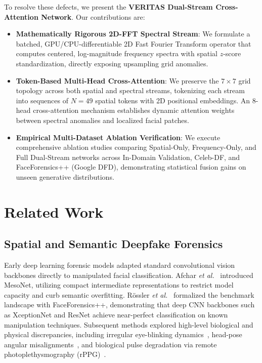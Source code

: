 \documentclass[journal,10pt,twocolumn]{article}
\begin{document}
To resolve these defects, we present the \textbf{VERITAS Dual-Stream Cross-Attention Network}. Our contributions are:
\begin{itemize}
    \item \textbf{Mathematically Rigorous 2D-FFT Spectral Stream}: We formulate a batched, GPU/CPU-differentiable 2D Fast Fourier Transform operator that computes centered, log-magnitude frequency spectra with spatial $z$-score standardization, directly exposing upsampling grid anomalies.
    \item \textbf{Token-Based Multi-Head Cross-Attention}: We preserve the $7 \times 7$ grid topology across both spatial and spectral streams, tokenizing each stream into sequences of $N=49$ spatial tokens with 2D positional embeddings. An 8-head cross-attention mechanism establishes dynamic attention weights between spectral anomalies and localized facial patches.
    \item \textbf{Empirical Multi-Dataset Ablation Verification}: We execute comprehensive ablation studies comparing Spatial-Only, Frequency-Only, and Full Dual-Stream networks across In-Domain Validation, Celeb-DF, and FaceForensics++ (Google DFD), demonstrating statistical fusion gains on unseen generative distributions.
\end{itemize}

\section{Related Work}
\label{sec:related}

\subsection{Spatial and Semantic Deepfake Forensics}
Early deep learning forensic models adapted standard convolutional vision backbones directly to manipulated facial classification. Afchar \textit{et al.}~\cite{afchar2018mesonet} introduced MesoNet, utilizing compact intermediate representations to restrict model capacity and curb semantic overfitting. R{\"o}ssler \textit{et al.}~\cite{rossler2019faceforensics} formalized the benchmark landscape with FaceForensics++, demonstrating that deep CNN backbones such as XceptionNet and ResNet achieve near-perfect classification on known manipulation techniques. Subsequent methods explored high-level biological and physical discrepancies, including irregular eye-blinking dynamics~\cite{li2018blinking}, head-pose angular misalignments~\cite{yang2019headpose}, and biological pulse degradation via remote photoplethysmography (rPPG)~\cite{ciftci2020fakecatcher}. 
\end{document}
